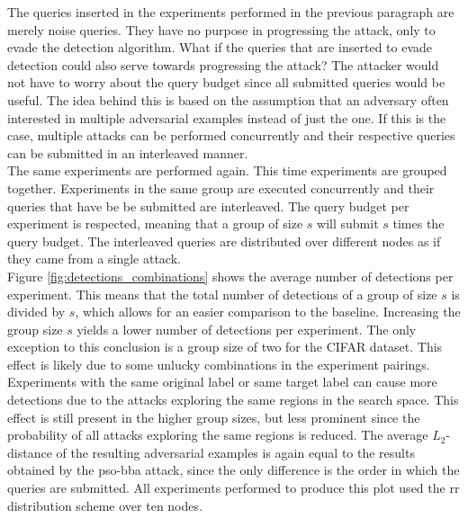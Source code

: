 The queries inserted in the experiments performed in the previous paragraph are merely noise queries. They have no purpose in progressing the attack, only to evade the detection algorithm. What if the queries that are inserted to evade detection could also serve towards progressing the attack? The attacker would not have to worry about the query budget since all submitted queries would be useful. The idea behind this is based on the assumption that an adversary often interested in multiple adversarial examples instead of just the one. If this is the case, multiple attacks can be performed concurrently and their respective queries can be submitted in an interleaved manner.\\

The same experiments are performed again. This time experiments are grouped together. Experiments in the same group are executed concurrently and their queries that have be be submitted are interleaved. The query budget per experiment is respected, meaning that a group of size $s$ will submit $s$ times the query budget. The interleaved queries are distributed over different nodes as if they came from a single attack.\\

Figure \ref{fig:detections_combinations} shows the average number of detections per experiment. This means that the total number of detections of a group of size $s$ is divided by $s$, which allows for an easier comparison to the baseline. Increasing the group size $s$ yields a lower number of detections per experiment. The only exception to this conclusion is a group size of two for the CIFAR dataset. This effect is likely due to some unlucky combinations in the experiment pairings. Experiments with the same original label or same target label can cause more detections due to the attacks exploring the same regions in the search space. This effect is still present in the higher group sizes, but less prominent since the probability of all attacks exploring the same regions is reduced. The average $L_2$-distance of the resulting adversarial examples is again equal to the results obtained by the \gls{pso}-\gls{bba} attack, since the only difference is the order in which the queries are submitted. All experiments performed to produce this plot used the \gls{rr} distribution scheme over ten nodes.\\

